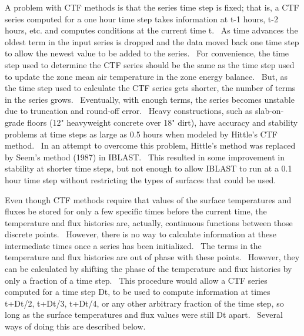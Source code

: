 A problem with CTF methods is that the series time step is fixed; that is, a CTF series computed for a one hour time step takes information at t-1 hours, t-2 hours, etc. and computes conditions at the current time t.~ As time advances the oldest term in the input series is dropped and the data moved back one time step to allow the newest value to be added to the series.~ For convenience, the time step used to determine the CTF series should be the same as the time step used to update the zone mean air temperature in the zone energy balance.~ But, as the time step used to calculate the CTF series gets shorter, the number of terms in the series grows.~ Eventually, with enough terms, the series becomes unstable due to truncation and round-off error.~ Heavy constructions, such as slab-on-grade floors (12" heavyweight concrete over 18" dirt), have accuracy and stability problems at time steps as large as 0.5 hours when modeled by Hittle's CTF method.~ In an attempt to overcome this problem, Hittle's method was replaced by Seem's method (1987) in IBLAST.~ This resulted in some improvement in stability at shorter time steps, but not enough to allow IBLAST to run at a 0.1 hour time step without restricting the types of surfaces that could be used.

Even though CTF methods require that values of the surface temperatures and fluxes be stored for only a few specific times before the current time, the temperature and flux histories are, actually, continuous functions between those discrete points.~ However, there is no way to calculate information at these intermediate times once a series has been initialized.~ The terms in the temperature and flux histories are out of phase with these points.~ However, they can be calculated by shifting the phase of the temperature and flux histories by only a fraction of a time step.~ This procedure would allow a CTF series computed for a time step Dt, to be used to compute information at times t+Dt/2, t+Dt/3, t+Dt/4, or any other arbitrary fraction of the time step, so long as the surface temperatures and flux values were still Dt apart.~ Several ways of doing this are described below.

